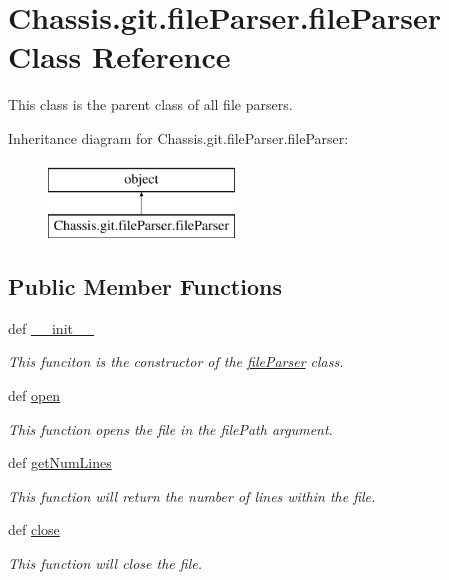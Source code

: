 \hypertarget{class_chassis_8git_1_1file_parser_1_1file_parser}{\section{Chassis.\-git.\-file\-Parser.\-file\-Parser Class Reference}
\label{class_chassis_8git_1_1file_parser_1_1file_parser}
}


This class is the parent class of all file parsers.  


Inheritance diagram for Chassis.\-git.\-file\-Parser.\-file\-Parser\-:\begin{figure}[H]
\begin{center}
\leavevmode
\includegraphics[height=2.000000cm]{class_chassis_8git_1_1file_parser_1_1file_parser}
\end{center}
\end{figure}
\subsection*{Public Member Functions}
\begin{DoxyCompactItemize}
\item 
def \hyperlink{class_chassis_8git_1_1file_parser_1_1file_parser_a1fae3a79d347d4177fc3abba9392d9da}{\-\_\-\-\_\-init\-\_\-\-\_\-}
\begin{DoxyCompactList}\small\item\em This funciton is the constructor of the \hyperlink{class_chassis_8git_1_1file_parser_1_1file_parser}{file\-Parser} class. \end{DoxyCompactList}\item 
def \hyperlink{class_chassis_8git_1_1file_parser_1_1file_parser_a64f356fcf7cc208418aa695b69e9c7db}{open}
\begin{DoxyCompactList}\small\item\em This function opens the file in the file\-Path argument. \end{DoxyCompactList}\item 
def \hyperlink{class_chassis_8git_1_1file_parser_1_1file_parser_ae48469d273d44a27386a44ebf2ca0119}{get\-Num\-Lines}
\begin{DoxyCompactList}\small\item\em This function will return the number of lines within the file. \end{DoxyCompactList}\item 
def \hyperlink{class_chassis_8git_1_1file_parser_1_1file_parser_addddca7b4ca27f76f80c37fe748717df}{close}
\begin{DoxyCompactList}\small\item\em This function will close the file. \end{DoxyCompactList}\end{DoxyCompactItemize}
